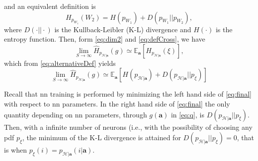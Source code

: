 \documentclass[conference,final]{IEEEtran}
\newcommand{\cross}[2]{H_{#1}(#2)}
\newcommand{\hatcross}[2]{\hat{H}_{#1}(#2)}
\newcommand{\gy}{g(\bm a)}
\newcommand{\E}[2]{\mathbb{E}_{#1}\left[#2\right]}
\begin{document}
\begin{appendices}
\begin{equation}
\end{equation}
and an equivalent definition is
\begin{equation}
\label{eq:alternativeDef}
		\cross{p_{W_1}}{W_2} = H (p_{W_1}) + D(p_{W_1}||p_{W_2}),
\end{equation}
where $D(\cdot||\cdot)$ is the Kullback-Leibler (K-L) divergence and $H(\cdot)$ is the entropy function.
Then, form \eqref{eq:dim2} and \eqref{eq:defCross}, we have 
\begin{equation}
		\lim_{S \to \infty}	\hatcross{p_{\mathcal{H}|\bm a}}{g} \simeq \mathbb{E}_{\bm a} \left[ \cross{p_{\mathcal{H}|\bm a}}{\xi} \right],
\end{equation}
which from \eqref{eq:alternativeDef} yields
\begin{equation}
\label{eq:final}
		\lim_{S \to \infty}	\hatcross{p_{\mathcal{H}|\bm a}}{g} \simeq 
		\E{\bm a}{H ( p_{\mathcal{H}|\bm a}) + D( p_{\mathcal{H}|\bm a}|| p_\xi)}
\end{equation}

Recall that \ac{nn} training is performed by minimizing the left hand side of \eqref{eq:final} with respect to \ac{nn} parameters. In the right hand side of \eqref{eq:final} the only quantity depending on \ac{nn} parameters, through $\gy$ in \eqref{eq:q}, is $D( p_{\mathcal{H}|\bm a}||p_\xi)$. Then, with a infinite number of neurons (i.e., with the possibility of choosing any \ac{pdf} $p_\xi$, the minimum of the K-L divergence is  attained for $D(p_{\mathcal{H}|\bm a}||p_\xi)=0$, that is when $p_\xi(i) = p_{\mathcal{H}|\bm a}(i|\bm{a})$.
\end{appendices}

\renewcommand*{\bibfont}{\footnotesize}

\printbibliography
\end{document}
